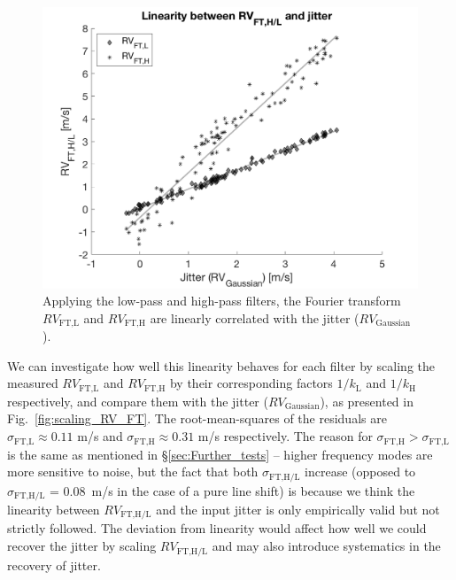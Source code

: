 \begin{figure}[tbp]
\centering
\includegraphics[width = 0.7 \linewidth]
{./Figures/Methods/5-JITTER_ONLY_1.png}
\caption[Fourier transform in response to line deformation]
{Applying the low-pass and high-pass filters, the Fourier transform $RV_\text{FT,L}$ and $RV_\text{FT,H}$ are linearly correlated with the jitter ($RV_\text{Gaussian}$).}
\label{fig:FT_vs_Gaussian}
\end{figure} 

We can investigate how well this linearity behaves for each filter by scaling the measured $RV_\text{FT,L}$ and $RV_\text{FT,H}$ by their corresponding factors $1/k_\text{L}$ and $1/k_\text{H}$ respectively, and compare them with the jitter ($RV_\text{Gaussian}$), as presented in Fig.~\ref{fig:scaling_RV_FT}. The root-mean-squares of the residuals are $\sigma_\text{FT,L} \approx 0.11$ m/s and $\sigma_\text{FT,H} \approx 0.31$ m/s respectively. The reason for $\sigma_\text{FT,H}>\sigma_\text{FT,L}$ is the same as mentioned in \S\ref{sec:Further_tests} -- higher frequency modes are more sensitive to noise, but the fact that both $\sigma_\text{FT,H/L}$ increase (opposed to $\sigma_\text{FT,H/L}$ = 0.08~m/s in the case of a pure line shift) is because we think the linearity between $RV_\text{FT,H/L}$ and the input jitter is only empirically valid but not strictly followed. The deviation from linearity would affect how well we could recover the jitter by scaling $RV_\text{FT,H/L}$ and may also introduce systematics in the recovery of jitter. 

